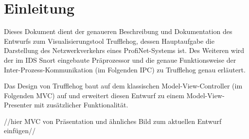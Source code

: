 \chapter{Einleitung} 
Dieses Dokument dient der genaueren Beschreibung und Dokumentation des Entwurfs zum Visualisierungstool Trufflehog, dessen Hauptaufgabe die Darstellung des Netzwerkverkehrs eines ProfiNet-Systems ist. Des Weiteren wird der im IDS Snort eingebaute Präprozessor \sppname und die genaue Funktionsweise der Inter-Prozess-Kommunikation (im Folgenden IPC) zu Trufflehog genau erläutert.

Das Design von Trufflehog baut auf dem klassischen Model-View-Controller (im Folgenden MVC) auf und erweitert diesen Entwurf zu einem Model-View-Presenter mit zusätzlicher Funktionalität.

//hier MVC von Präsentation und ähnliches Bild zum aktuellen Entwurf einfügen//
